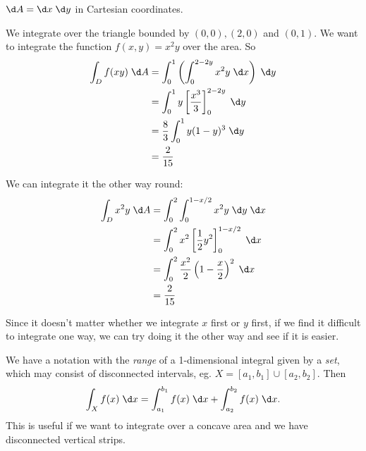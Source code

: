 \documentclass[a4paper]{article}
\begin{document}
\begin{prop}
  $\d A = \d x\;\d y$ in Cartesian coordinates.
\end{prop}

\begin{eg}
  We integrate over the triangle bounded by $(0, 0), (2, 0)$ and $(0, 1)$. We want to integrate the function $f(x, y) = x^2y$ over the area. So
  \begin{align*}
    \int _D f(x y)\;\d A &= \int_0^1 \left(\int_0^{2 - 2y}x^2y \;\d x\right)\; \d y\\
    &= \int_0^1 y\left[\frac{x^3}{3}\right]^{2 - 2y}_0 \;\d y\\
    &= \frac{8}{3}\int_0^1 y(1 - y)^3\;\d y\\
    &= \frac{2}{15}
  \end{align*}

  We can integrate it the other way round:
  \begin{align*}
    \int_D x^2 y\;\d A &= \int_0^2 \int_0^{1 - x/2}x^2y \;\d y\;\d x\\
    &= \int_0^2 x^2\left[\frac{1}{2}y^2\right]_0^{1 - x/2}\;\d x\\
    &= \int_0^2 \frac{x^2}{2} \left(1 - \frac{x}{2}\right)^2 \;\d x\\
    &= \frac{2}{15}
  \end{align*}
\end{eg}

Since it doesn't matter whether we integrate $x$ first or $y$ first, if we find it difficult to integrate one way, we can try doing it the other way and see if it is easier.

\note We have a notation with the \emph{range} of a 1-dimensional integral given by a \emph{set}, which may consist of disconnected intervals, eg. $X = [a_1, b_1]\cup [a_2, b_2]$. Then
\[
  \int_X f(x)\; \d x = \int_{a_1}^{b_1} f(x) \;\d x + \int_{a_2}^{b_2}f(x)\;\d x.
\]
This is useful if we want to integrate over a concave area and we have disconnected vertical strips.

\begin{center}
\end{center}
\end{document}
